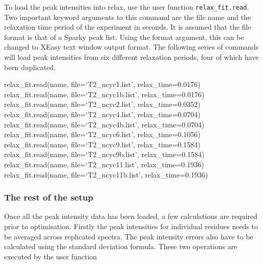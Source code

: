 
To load the peak intensities into relax, use the user function \texttt{relax\_fit.read}.  Two important keyword arguments to this command are the file name and the relaxation time period of the experiment in seconds.  It is assumed that the file format is that of a Sparky peak list.  Using the format argument, this can be changed to XEasy text window output format.  The following series of commands will load peak intensities from six different relaxation periods, four of which have been duplicated.

\begin{exampleenv}
relax\_fit.read(name, file=`T2\_ncyc1.list', relax\_time=0.0176) \\
relax\_fit.read(name, file=`T2\_ncyc1b.list', relax\_time=0.0176) \\
relax\_fit.read(name, file=`T2\_ncyc2.list', relax\_time=0.0352) \\
relax\_fit.read(name, file=`T2\_ncyc4.list', relax\_time=0.0704) \\
relax\_fit.read(name, file=`T2\_ncyc4b.list', relax\_time=0.0704) \\
relax\_fit.read(name, file=`T2\_ncyc6.list', relax\_time=0.1056) \\
relax\_fit.read(name, file=`T2\_ncyc9.list', relax\_time=0.1584) \\
relax\_fit.read(name, file=`T2\_ncyc9b.list', relax\_time=0.1584) \\
relax\_fit.read(name, file=`T2\_ncyc11.list', relax\_time=0.1936) \\
relax\_fit.read(name, file=`T2\_ncyc11b.list', relax\_time=0.1936) \\
\end{exampleenv}


\subsubsection{The rest of the setup}

Once all the peak intensity data has been loaded, a few calculations are required prior to optimisation.  Firstly the peak intensities for individual residues needs to be averaged across replicated spectra.  The peak intensity errors also have to be calculated using the standard deviation formula.  These two operations are executed by the user function

